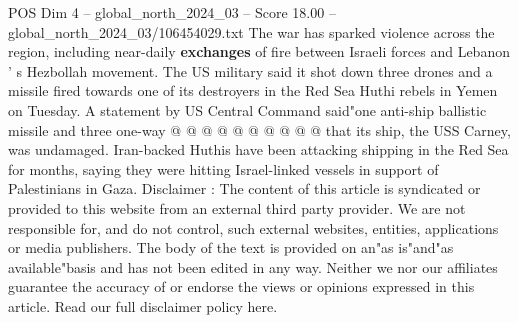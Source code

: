 \begin{textsample}{POS Dim 4 – global\_north\_2024\_03 – Score 18.00 – global\_north\_2024\_03/106454029.txt}
The war has sparked violence across the region, including near-daily \textbf{exchanges} of fire between Israeli forces and Lebanon ' s Hezbollah movement.
The US military said it shot down three drones and a missile fired towards one of its destroyers in the Red Sea Huthi rebels in Yemen on Tuesday.
A statement by US Central Command said"one anti-ship ballistic missile and three one-way @ @ @ @ @ @ @ @ @ @ that its ship, the USS Carney, was undamaged.
Iran-backed Huthis have been attacking shipping in the Red Sea for months, saying they were hitting Israel-linked vessels in support of Palestinians in Gaza.
Disclaimer : The content of this article is syndicated or provided to this website from an external third party provider.
We are not responsible for, and do not control, such external websites, entities, applications or media publishers.
The body of the text is provided on an"as is"and"as available"basis and has not been edited in any way.
Neither we nor our affiliates guarantee the accuracy of or endorse the views or opinions expressed in this article.
Read our full disclaimer policy here.

\end{textsample}
